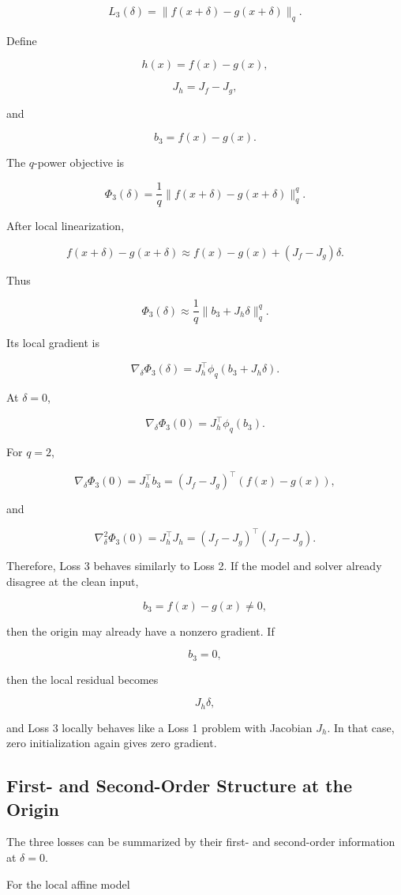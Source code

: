 \documentclass{article}
\begin{document}
\[
L_3(\delta)
=
\|f(x+\delta)-g(x+\delta)\|_q.
\]

Define

\[
h(x)=f(x)-g(x),
\]

\[
J_h=J_f-J_g,
\]

and

\[
b_3=f(x)-g(x).
\]

The \(q\)-power objective is

\[
\Phi_3(\delta)
=
\frac{1}{q}
\|f(x+\delta)-g(x+\delta)\|_q^q.
\]

After local linearization,

\[
f(x+\delta)-g(x+\delta)
\approx
f(x)-g(x)+(J_f-J_g)\delta.
\]

Thus

\[
\Phi_3(\delta)
\approx
\frac{1}{q}
\|b_3+J_h\delta\|_q^q.
\]

Its local gradient is

\[
\nabla_\delta \Phi_3(\delta)
=
J_h^\top\phi_q(b_3+J_h\delta).
\]

At \(\delta=0\),

\[
\nabla_\delta \Phi_3(0)
=
J_h^\top\phi_q(b_3).
\]

For \(q=2\),

\[
\nabla_\delta \Phi_3(0)
=
J_h^\top b_3
=
(J_f-J_g)^\top(f(x)-g(x)),
\]

and

\[
\nabla_\delta^2\Phi_3(0)
=
J_h^\top J_h
=
(J_f-J_g)^\top(J_f-J_g).
\]

Therefore, Loss 3 behaves similarly to Loss 2. If the model and solver already disagree at the clean input,

\[
b_3=f(x)-g(x)\neq0,
\]

then the origin may already have a nonzero gradient. If

\[
b_3=0,
\]

then the local residual becomes

\[
J_h\delta,
\]

and Loss 3 locally behaves like a Loss 1 problem with Jacobian \(J_h\). In that case, zero initialization again gives zero gradient.

\subsection{First- and Second-Order Structure at the Origin}

The three losses can be summarized by their first- and second-order information at \(\delta=0\).

For the local affine model
\end{document}
